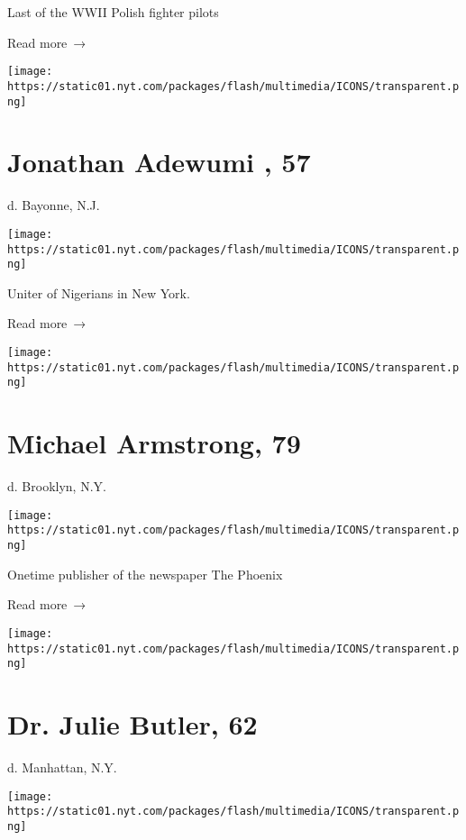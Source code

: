 Last of the WWII Polish fighter pilots

 Read more~→

\href{https://www.nytimes.com/2020/05/14/obituaries/jonathan-adewumi-dies-coronavirus.html}{}

\texttt{[image: https://static01.nyt.com/packages/flash/multimedia/ICONS/transparent.png]}

\hypertarget{jonathan-adewumi--57}{%
\section{Jonathan Adewumi , 57}\label{jonathan-adewumi--57}}

d. Bayonne, N.J.

\texttt{[image: https://static01.nyt.com/packages/flash/multimedia/ICONS/transparent.png]}

Uniter of Nigerians in New York.

 Read more~→

\href{https://www.nytimes.com/2020/05/13/obituaries/michael-armstrong-dead-coronavirus.html}{}

\texttt{[image: https://static01.nyt.com/packages/flash/multimedia/ICONS/transparent.png]}

\hypertarget{michael-armstrong-79}{%
\section{Michael Armstrong, 79}\label{michael-armstrong-79}}

d. Brooklyn, N.Y.

\texttt{[image: https://static01.nyt.com/packages/flash/multimedia/ICONS/transparent.png]}

Onetime publisher of the newspaper The Phoenix

 Read more~→

\href{https://www.nytimes.com/2020/05/12/obituaries/dr-julie-butler-dead-coronavirus.html}{}

\texttt{[image: https://static01.nyt.com/packages/flash/multimedia/ICONS/transparent.png]}

\hypertarget{dr-julie-butler-62}{%
\section{Dr. Julie Butler, 62}\label{dr-julie-butler-62}}

d. Manhattan, N.Y.

\texttt{[image: https://static01.nyt.com/packages/flash/multimedia/ICONS/transparent.png]}

